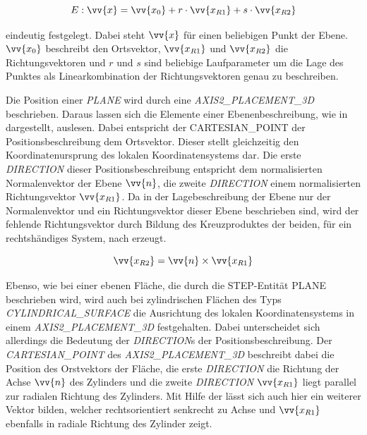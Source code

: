 \begin{equation}\label{eq:plane}
E: \vv{x} = \vv{x_{0}} + r \cdot \vv{x_{R1}} + s \cdot \vv{x_{R2}}  
\end{equation}

eindeutig festgelegt. Dabei steht $\vv{x}$ für einen beliebigen Punkt der Ebene. $\vv{x_{0}}$ beschreibt den Ortsvektor, $\vv{x_{R1}}$ und $\vv{x_{R2}}$  die Richtungsvektoren und $r$ und $s$ sind beliebige Laufparameter um die Lage des Punktes als Linearkombination der Richtungsvektoren genau zu beschreiben.

Die Position einer \textit{PLANE} wird durch eine \textit{AXIS2\_PLACEMENT\_3D} beschrieben. Daraus lassen sich die Elemente einer Ebenenbeschreibung, wie in  dargestellt, auslesen. 
Dabei entspricht der CARTESIAN\_POINT der Positionsbeschreibung dem Ortsvektor. Dieser stellt gleichzeitig den Koordinatenursprung des lokalen Koordinatensystems dar. Die erste \textit{DIRECTION} dieser Positionsbeschreibung entspricht dem normalisierten Normalenvektor der Ebene $\vv{n}$, die zweite \textit{DIRECTION} einem normalisierten Richtungsvektor $\vv{x_{R1}}$. Da in der Lagebeschreibung der Ebene nur der Normalenvektor und ein Richtungsvektor dieser Ebene beschrieben sind, wird der fehlende Richtungsvektor durch Bildung des Kreuzproduktes der beiden, für ein rechtshändiges System, nach  erzeugt.

\begin{equation}\label{eq:crossproduct}
\vv{x_{R2}} = \vv{n} \times \vv{x_{R1}}
\end{equation}  

Ebenso, wie bei einer ebenen Fläche, die durch die STEP-Entität PLANE beschrieben wird, wird auch bei zylindrischen Flächen des Typs \textit{CYLINDRICAL\_SURFACE} die Ausrichtung des lokalen Koordinatensystems in einem \textit{AXIS2\_PLACEMENT\_3D} festgehalten. Dabei unterscheidet sich allerdings die Bedeutung der \textit{DIRECTION}s der Positionsbeschreibung. Der \textit{CARTESIAN\_POINT} des \textit{AXIS2\_PLACEMENT\_3D} beschreibt dabei die Position des Orstvektors der Fläche, die erste \textit{DIRECTION} die Richtung der Achse $\vv{n}$ des Zylinders und die zweite \textit{DIRECTION} $\vv{x_{R1}}$ liegt parallel zur radialen Richtung des Zylinders. Mit Hilfe der  lässt sich auch hier ein weiterer Vektor bilden, welcher rechtsorientiert senkrecht zu Achse und $\vv{x_{R1}}$ ebenfalls in radiale Richtung des Zylinder zeigt. 

